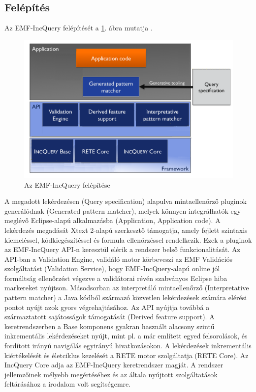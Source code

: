 \subsection{Felépítés}

Az EMF-IncQuery felépítését a \ref{fig:EMFIncQueryStructure}. ábra mutatja \cite{Bergmann-TOOLS-2012}.
%
\begin{figure}[htb]
\centering
\includegraphics[width=\textwidth]{figures/emf-incquery-structure.png}
\caption{Az EMF-IncQuery felépítése}
\label{fig:EMFIncQueryStructure}
\end{figure}
%
A megadott lekérdezésen (Query specification) alapulva mintaellenőrző pluginok generálódnak (Generated pattern matcher), melyek könnyen integrálhatók egy meglévő Eclipse-alapú alkalmazásba (Application, Application code).
A lekérdezés megadását Xtext 2-alapú szerkesztő támogatja, amely fejlett szintaxis kiemeléssel, kódkiegészítéssel és formula ellenőrzéssel rendelkezik.
Ezek a pluginok az EMF-IncQuery API-n keresztül elérik a rendszer belső funkcionalitását.
Az API-ban a Validation Engine, validáló motor körbeveszi az EMF Validációs szolgáltatást  (Validation Service), hogy EMF-IncQuery-alapú online jól formáltság ellenőrzést végezve a validátorai révén szabványos Eclipse hiba markereket nyújtson.
Másodsorban az interpretáló mintaellenőrző (Interpretative pattern matcher) a Java kódból származó közvetlen lekérdezések számára elérési pontot nyújt azok gyors végrehajtásához.
Az API nyújtja továbbá a származtatott sajátosságok támogatását (Derived feature support).
A keretrendszerben a Base komponens gyakran használt alacsony szintű inkrementális lekérdezéseket nyújt, mint pl. a már említett egyed felsorolások, és fordított irányú navigálás egyirányú hivatkozásokon.
A lekérdezések inkrementális kiértékelését és életciklus kezelését a RETE motor szolgáltatja (RETE Core).
Az IncQuery Core adja az EMF-IncQuery keretrendszer magját.
A rendszer jellemzőinek mélyebb megértéséhez és az általa nyújtott szolgáltatások feltárásához a \cite{Bergmann-TOOLS-2012} irodalom volt segítségemre.

